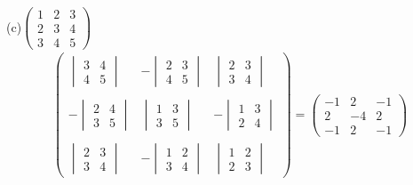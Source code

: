 \documentclass[10pt]{extarticle}
\begin{document}
\begin{itemize}
		(c)$\begin{pmatrix}
			1&2&3 \\
			2&3&4\\
			3&4&5
		\end{pmatrix}$
				\begin{gather*}
				\begin{pmatrix}
					\begin{vmatrix}
						3&4 \\
						4&5
					\end{vmatrix}
					&-\begin{vmatrix}
						2&3 \\
						4&5
					\end{vmatrix}
					&\begin{vmatrix}
						2&3\\
						3&4
					\end{vmatrix}
					\\
					\\
					-\begin{vmatrix}
							2&4\\
						3&5
					\end{vmatrix}
					&\begin{vmatrix}
						1&3 \\
						3&5
					\end{vmatrix}
					&-\begin{vmatrix}
							1&3 \\
						2&4
					\end{vmatrix}
					\\
					\\
					\begin{vmatrix}
						2&3 \\
						3&4
					\end{vmatrix}
					&-\begin{vmatrix}
							1&2 \\
						3&4
					\end{vmatrix}
					&\begin{vmatrix}
						1&2 \\
						2&3
					\end{vmatrix}
				\end{pmatrix}
				=\begin{pmatrix}
					-1&2&-1 \\
					2&-4&2\\
					-1&2&-1
				\end{pmatrix}
			\end{gather*}
		

\end{itemize}
\end{document}
